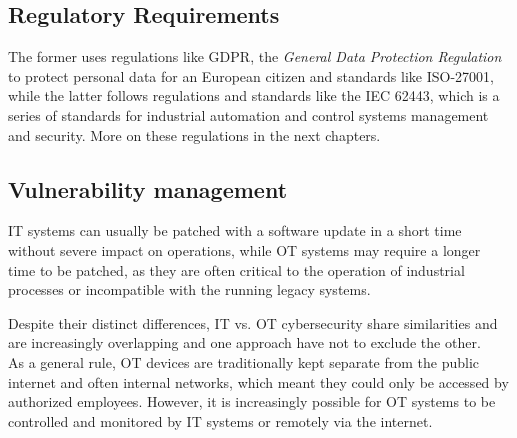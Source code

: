 \subsection{Regulatory Requirements}

The former uses regulations like GDPR, the \textit{General Data Protection Regulation} to protect personal data for an European citizen and standards like ISO-27001, while the latter follows regulations and standards like the IEC 62443, which is a series of standards for industrial automation and control systems management and security. More on these regulations in the next chapters.

\subsection{Vulnerability management}

IT systems can usually be patched with a software update in a short time without severe impact on operations, while OT systems may require a longer time to be patched, as they are often critical to the operation of industrial processes or incompatible with the running legacy systems.


Despite their distinct differences, IT vs. OT cybersecurity share similarities and are increasingly overlapping and one approach have not to exclude the other.\\
As a general rule, OT devices are traditionally kept separate from the public internet and often internal networks, which meant they could only be accessed by authorized employees. However, it is increasingly possible for OT systems to be controlled and monitored by IT systems or remotely via the internet.~\cite{it-vs-ot-cybersecurity}

